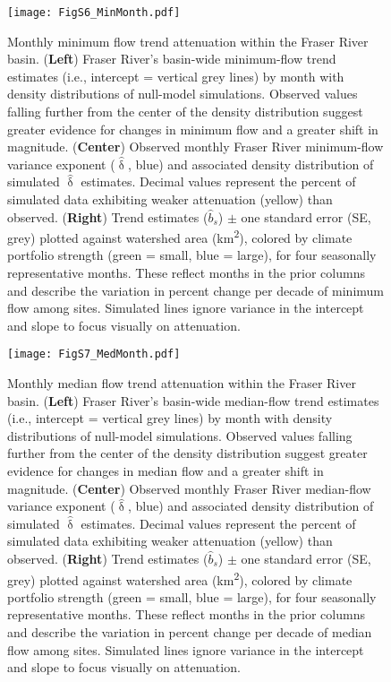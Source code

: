 \documentclass[draft,grl]{agutexSI}
\begin{document}
\begin{figure}[h]
	\centering
	\noindent\texttt{[image: FigS6\_MinMonth.pdf]}
	\caption{Monthly minimum flow trend attenuation within the Fraser River basin. (\textbf{Left}) Fraser River's basin-wide minimum-flow trend estimates (i.e., intercept = vertical grey lines) by month with density distributions of null-model simulations. Observed values falling further from the center of the density distribution suggest greater evidence for changes in minimum flow and a greater shift in magnitude. (\textbf{Center}) Observed monthly Fraser River minimum-flow variance exponent ($\hat{\updelta}$, blue) and associated density distribution of simulated $\hat{\updelta}$ estimates. Decimal values represent the percent of simulated data exhibiting weaker attenuation (yellow) than observed. (\textbf{Right}) Trend estimates ($\hat{b}_{s}$) $\pm$ one standard error (SE, grey) plotted against watershed area (km\textsuperscript{2}), colored by climate portfolio strength (green = small, blue = large), for four seasonally representative months. These reflect months in the prior columns and describe the variation in percent change per decade of minimum flow among sites. Simulated lines ignore variance in the intercept and slope to focus visually on attenuation.}
	\label{fig:S6}
\end{figure}

\begin{figure}[h]
	\centering
	\noindent\texttt{[image: FigS7\_MedMonth.pdf]}
	\caption{Monthly median flow trend attenuation within the Fraser River basin. (\textbf{Left}) Fraser River's basin-wide median-flow trend estimates (i.e., intercept = vertical grey lines) by month with density distributions of null-model simulations. Observed values falling further from the center of the density distribution suggest greater evidence for changes in median flow and a greater shift in magnitude. (\textbf{Center}) Observed monthly Fraser River median-flow variance exponent ($\hat{\updelta}$, blue) and associated density distribution of simulated $\hat{\updelta}$ estimates. Decimal values represent the percent of simulated data exhibiting weaker attenuation (yellow) than observed. (\textbf{Right}) Trend estimates ($\hat{b}_{s}$) $\pm$ one standard error (SE, grey) plotted against watershed area (km\textsuperscript{2}), colored by climate portfolio strength (green = small, blue = large), for four seasonally representative months. These reflect months in the prior columns and describe the variation in percent change per decade of median flow among sites. Simulated lines ignore variance in the intercept and slope to focus visually on attenuation.}
	\label{fig:S7}
\end{figure}
\end{document}

